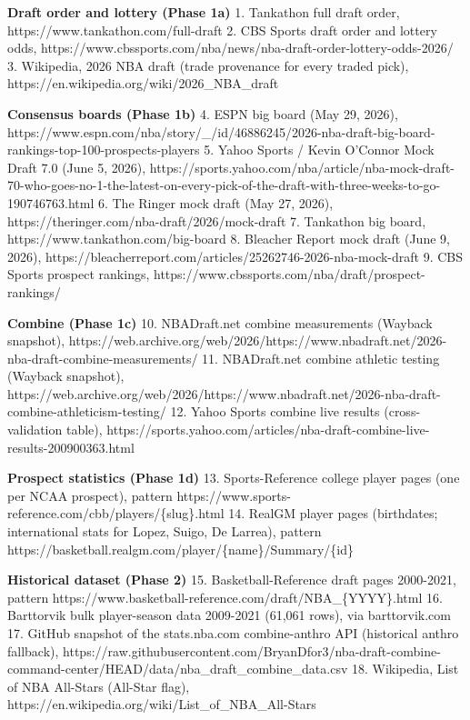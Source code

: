 \documentclass[
  10pt,
]{article}
\begin{document}
\textbf{Draft order and lottery (Phase 1a)} 1. Tankathon full draft order,
https://www.tankathon.com/full-draft 2. CBS Sports draft order and lottery odds,
https://www.cbssports.com/nba/news/nba-draft-order-lottery-odds-2026/ 3.
Wikipedia, 2026 NBA draft (trade provenance for every traded pick),
https://en.wikipedia.org/wiki/2026\_NBA\_draft

\textbf{Consensus boards (Phase 1b)} 4. ESPN big board (May 29, 2026),
https://www.espn.com/nba/story/\_/id/46886245/2026-nba-draft-big-board-rankings-top-100-prospects-players
5. Yahoo Sports / Kevin O'Connor Mock Draft 7.0 (June 5, 2026),
https://sports.yahoo.com/nba/article/nba-mock-draft-70-who-goes-no-1-the-latest-on-every-pick-of-the-draft-with-three-weeks-to-go-190746763.html
6. The Ringer mock draft (May 27, 2026),
https://theringer.com/nba-draft/2026/mock-draft 7. Tankathon big board,
https://www.tankathon.com/big-board 8. Bleacher Report mock draft (June 9,
2026), https://bleacherreport.com/articles/25262746-2026-nba-mock-draft 9. CBS
Sports prospect rankings, https://www.cbssports.com/nba/draft/prospect-rankings/

\textbf{Combine (Phase 1c)} 10. NBADraft.net combine measurements (Wayback
snapshot),
https://web.archive.org/web/2026/https://www.nbadraft.net/2026-nba-draft-combine-measurements/
11. NBADraft.net combine athletic testing (Wayback snapshot),
https://web.archive.org/web/2026/https://www.nbadraft.net/2026-nba-draft-combine-athleticism-testing/
12. Yahoo Sports combine live results (cross-validation table),
https://sports.yahoo.com/articles/nba-draft-combine-live-results-200900363.html

\textbf{Prospect statistics (Phase 1d)} 13. Sports-Reference college player
pages (one per NCAA prospect), pattern
https://www.sports-reference.com/cbb/players/\{slug\}.html 14. RealGM player
pages (birthdates; international stats for Lopez, Suigo, De Larrea), pattern
https://basketball.realgm.com/player/\{name\}/Summary/\{id\}

\textbf{Historical dataset (Phase 2)} 15. Basketball-Reference draft pages
2000-2021, pattern https://www.basketball-reference.com/draft/NBA\_\{YYYY\}.html
16. Barttorvik bulk player-season data 2009-2021 (61,061 rows), via
barttorvik.com 17. GitHub snapshot of the stats.nba.com combine-anthro API
(historical anthro fallback),
https://raw.githubusercontent.com/BryanDfor3/nba-draft-combine-command-center/HEAD/data/nba\_draft\_combine\_data.csv
18. Wikipedia, List of NBA All-Stars (All-Star flag),
https://en.wikipedia.org/wiki/List\_of\_NBA\_All-Stars
\end{document}
